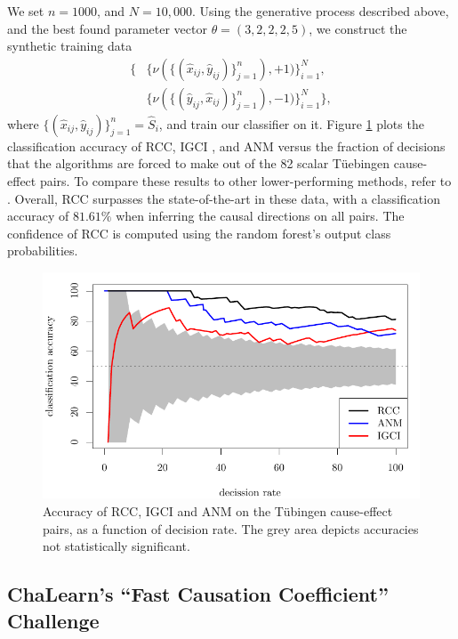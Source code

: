 \documentclass[twoside,11pt,a4paper]{article}
\begin{document}
We set $n = 1000$, and $N = 10,000$. Using the generative process described 
above, and the best found parameter vector $\theta = (3,2,2,2,5)$, we
construct the synthetic training data 
\begin{align*}
  \{&\{\nu(\{(\hat{x}_{ij}, \hat{y}_{ij})\}_{j=1}^{n}), +1)\}_{i=1}^{N},\\
  &\{\nu(\{(\hat{y}_{ij}, \hat{x}_{ij})\}_{j=1}^{n}), -1)\}_{i=1}^{N}\},
\end{align*}
where $\{(\hat{x}_{ij}, \hat{y}_{ij})\}_{j=1}^{n} = \hat{S}_i$, and train
our classifier on it.
%
Figure \ref{fig:tuebingen} plots the classification accuracy of RCC, IGCI
\citep{Daniusis12}, and ANM \citep{Mooij14} versus the fraction of decisions
that the algorithms are forced to make out of the 82 scalar T\"uebingen
cause-effect pairs. To compare these results to other lower-performing methods,
refer to \citet{Janzing12}. Overall, RCC surpasses the state-of-the-art in these
data, with a classification accuracy of $81.61\%$ when inferring the causal
directions on all pairs. The confidence of RCC is computed using the
random forest's output class probabilities.

\begin{figure}[t]
  \begin{center}
    \includegraphics[width=0.8\linewidth]{plot.pdf} 
  \end{center}
  \vspace{-10pt}
  \caption{Accuracy of RCC, IGCI and ANM on the T\"ubingen cause-effect pairs,
  as a function of decision rate. The grey area depicts accuracies not
  statistically significant.}
  \label{fig:tuebingen}
\end{figure}


\subsection{ChaLearn's ``Fast Causation Coefficient'' Challenge}
\end{document}
